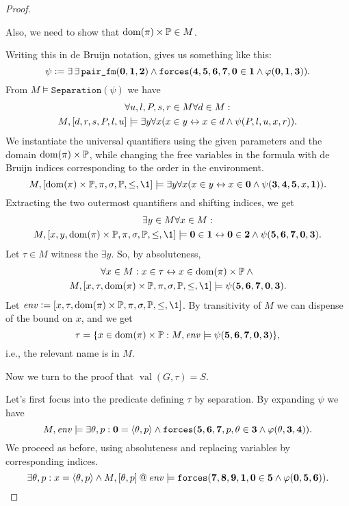 \documentclass[11pt,english]{article}
\makeatletter
\renewcommand{\PP}{\mathbb{P}}
\newcommand{\forceisa}{\mathtt{forces}}
\newcommand{\concat}{\mathbin{@}}
\newcommand{\dB}[1]{\mathbf{#1}}
\DeclareMathOperator{\val}{val}
\makeatother
\begin{document}
\begin{proof}
\begin{framed}
    Also, we need to show that $\dom(\pi)\times\PP\in M$.
  \end{framed}
  Writing this in de Bruijn notation, gives us something like this:
  \[
  \psi \defi  \exists\,\exists\,\verb|pair_fm|(\dB{0},\dB{1},\dB{2}) \y
  \forceisa(\dB{4},\dB{5},\dB{6},\dB{7},\dB{0}\in \dB{1}\y\phi(\dB{0},\dB{1},\dB{3})).
  \]
  From $M\models \mathtt{Separation}(\psi)$ we have
  \begin{multline*}
    \forall u,l,P,s,r\in M \forall d\in M:\\ 
    M,[d,r,s,P,l,u] \models\exists y \forall x
    (x\in y \leftrightarrow x\in d \wedge \psi(P,l,u,x,r)).
  \end{multline*}
  We instantiate the universal quantifiers using the given parameters
  and the domain $\dom(\pi)\times\PP$, while changing the free variables in
  the formula with de Bruijn indices corresponding to the order in the
  environment.
  \[
  M,[\dom(\pi)\times\PP,\pi,\sig,\PP,\leq,\1] \models\exists y \forall x
  (x\in y \lsii x\in \dB{0} \y \psi(\dB{3},\dB{4},\dB{5},x,\dB{1})).
  \]
  Extracting the two outermost quantifiers and shifting indices, we get
  \begin{multline*}
    \exists y\in M \forall x\in M: \\
    M,[x,y,\dom(\pi)\times\PP,\pi,\sig,\PP,\leq,\1] \models
    \dB{0}\in \dB{1} \lsii \dB{0}\in \dB{2} \y \psi(\dB{5},\dB{6},\dB{7},\dB{0},\dB{3}).
  \end{multline*}
  Let $\tau\in M$ witness the $\exists y$. So, by absoluteness,
  \begin{multline*}
    \forall x\in M: 
    x\in\tau \lsii  x\in\dom(\pi)\times\PP \y{}\\ 
  M,[x,\tau,\dom(\pi)\times\PP,\pi,\sig,\PP,\leq,\1] \models
  \psi(\dB{5},\dB{6},\dB{7},\dB{0},\dB{3}).
  \end{multline*}
  Let $\mathit{env}\defi
  [x,\tau,\dom(\pi)\times\PP,\pi,\sig,\PP,\leq,\1]$. By transitivity
  of $M$ we can dispense of the bound on $x$, and we get
  \[
  \tau = \{x\in\dom(\pi)\times\PP :
  M, \mathit{env}\models
  \psi(\dB{5},\dB{6},\dB{7},\dB{0},\dB{3})\},
  \]
  i.e., the relevant name is in $M$.
  
  Now we turn to the proof that $\val(G,\tau)=S$.
  
  Let's first focus into the predicate defining $\tau$ by separation. By expanding $\psi$ we have
  \[
   M, \mathit{env}\models
   \exists \th,p : \dB{0}=\lb\th,p\rb \y
   \forceisa(\dB{5},\dB{6},\dB{7},p,\th\in \dB{3}\y\phi(\th,\dB{3},\dB{4})).
  \]
  We proceed as before, using absoluteness and replacing variables by
  corresponding indices.
  \[
  \exists \th,p : x =\lb\th,p\rb \y  M, [\th,p]\concat\mathit{env}\models
  \forceisa(\dB{7},\dB{8},\dB{9},\dB{1},\dB{0}\in \dB{5}\y\phi(\dB{0},\dB{5},\dB{6})).
  \]
    

\end{proof}
\end{document}
